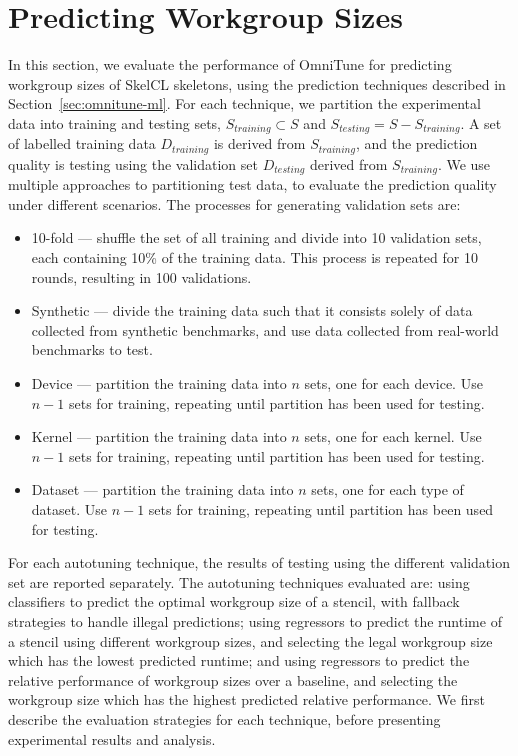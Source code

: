 \section{Predicting Workgroup Sizes}

In this section, we evaluate the performance of OmniTune for
predicting workgroup sizes of SkelCL skeletons, using the prediction
techniques described in Section~\ref{sec:omnitune-ml}. For each
technique, we partition the experimental data into training and
testing sets, $S_{training} \subset S$ and
$S_{testing} = S - S_{training}$. A set of labelled training data
$D_{training}$ is derived from $S_{training}$, and the prediction
quality is testing using the validation set $D_{testing}$ derived from
$S_{training}$. We use multiple approaches to partitioning test data,
to evaluate the prediction quality under different scenarios. The
processes for generating validation sets are:
%
\begin{itemize}
\item 10-fold --- shuffle the set of all training and divide into 10
  validation sets, each containing 10\% of the training data. This
  process is repeated for 10 rounds, resulting in 100 validations.
\item Synthetic --- divide the training data such that it consists
  solely of data collected from synthetic benchmarks, and use data
  collected from real-world benchmarks to test.
\item Device --- partition the training data into $n$ sets, one for
  each device. Use $n-1$ sets for training, repeating until partition
  has been used for testing.
\item Kernel --- partition the training data into $n$ sets, one for
  each kernel. Use $n-1$ sets for training, repeating until partition
  has been used for testing.
\item Dataset --- partition the training data into $n$ sets, one for
  each type of dataset. Use $n-1$ sets for training, repeating until
  partition has been used for testing.
\end{itemize}
%
For each autotuning technique, the results of testing using the
different validation set are reported separately. The autotuning
techniques evaluated are: using classifiers to predict the optimal
workgroup size of a stencil, with fallback strategies to handle
illegal predictions; using regressors to predict the runtime of a
stencil using different workgroup sizes, and selecting the legal
workgroup size which has the lowest predicted runtime; and using
regressors to predict the relative performance of workgroup sizes over
a baseline, and selecting the workgroup size which has the highest
predicted relative performance. We first describe the evaluation
strategies for each technique, before presenting experimental results
and analysis.



